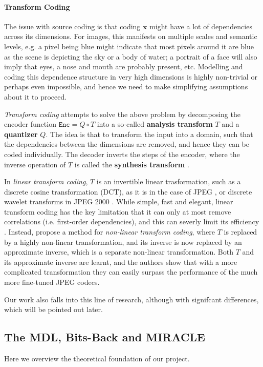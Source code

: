 \documentclass{article}
\renewcommand{\vec}[1]{\mathbf{#1}}
\newcommand{\Enc}{\mathtt{Enc}}
\begin{document}
\paragraph{Transform Coding}
The issue with source coding is that coding $\vec{x}$ might have a lot of
dependencies across its dimensions. For images, this manifests on multiple
scales and semantic levels, e.g. a pixel being blue might indicate that most
pixels around it are blue as the scene is depicting the sky or a body of water;
a portrait of a face will also imply that eyes, a nose and mouth are probably
present, etc. Modelling and coding this dependence structure in very high
dimensions is highly non-trivial or perhaps even impossible, and hence we need
to make simplifying assumptions about it to proceed.
\par
\textit{Transform coding} attempts to solve the above problem by decomposing the
encoder function $\Enc = Q \circ T$ into a so-called \textbf{analysis transform}
$T$ and a \textbf{quantizer} $Q$. The idea is that to transform the input into a
domain, such that the dependencies between the dimensions are removed, and hence
they can be coded individually. The decoder inverts the steps of the encoder,
where the inverse operation of $T$ is called the \textbf{synthesis transform}
\cite{gupta2011modified}.
\par
In \textit{linear transform coding}, $T$ is an invertible linear trasformation,
such as a discrete cosine transformation (DCT), as it is in the case of JPEG
\cite{wallace1992jpeg}, or discrete wavelet transforms in JPEG 2000
\cite{rabbani2002overview}. While simple, fast and elegant, linear transform
coding has the key limitation that it can only at most remove correlations (i.e.
first-order dependencies), and this can severly limit its efficiency
\cite{balle2016endtrans}. Instead, \cite{balle2016endtrans} propose a method for
\textit{non-linear transform coding}, where $T$ is replaced by a highly
non-linear transformation, and its inverse is now replaced by an approximate
inverse, which is a separate non-linear transformation. Both $T$ and its
approximate inverse are learnt, and the authors show that with a more
complicated transformation they can easily surpass the performance of the much
more fine-tuned JPEG codecs.
\par
Our work also falls into this line of research, although with signifcant
differences, which will be pointed out later.
\subsection{The MDL, Bits-Back and MIRACLE}
\par
Here we overview the theoretical foundation of our project.
\end{document}
